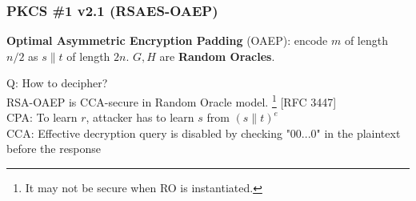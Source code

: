 \begin{comment}
\begin{frame}\frametitle{PKCS \#1 v1.5 (RSAES-PKCS1-v1\_5)}
\textbf{Public-Key Cryptography Standard (PKCS) \#1 version 1.5}:
\begin{itemize}
\item $N$ has $k$ bytes, $2^{8(k-1)} \le N < 2^{8k}$.
\item Message $m$ has $D (\le k-11)$ bytes.
\item Random pad $r$ has $(k-D-3)$ bytes without $\{0\}^8$.
\item The ciphertext:
\end{itemize}
\[[(\{0\}^8\|\{0\}^610\|r\|\{0\}^8\|m)^e \bmod N]\] 
\textbf{Security}: PKCS \#1 v1.5 is believed to be CPA-secure, although no proof based on the RSA assumption has ever been shown.
\end{frame}
\begin{frame}\frametitle{Attack on PKCS \#1 v1.5}
\textbf{PKCS \#1 v1.5 used in HTTPS}:\\
if the first 16 bits of message is not ``02'' which is standing for ``PKCK \#1'', then the web server returns error.\newline

\textbf{CCA to infer the message $m$ of ciphertext $c$}:
\begin{enumerate}
\item choose a string $r$, compute $c' \gets r^e\cdot c = (r\cdot \mathsf{PKCS1}(m))^e$.
\item send $c'$ to the web server. If the server does not return error, some bits of $m$ can be learned.
\item change $r$ and learn other bits of $m$.
\end{enumerate}

\textbf{HTTPS Defense} [RFC 5246]: if not ``02'', set the message as a random string.
\end{frame}
\end{comment}

\begin{frame}\frametitle{PKCS \#1 v2.1 (RSAES-OAEP)}
\textbf{Optimal Asymmetric Encryption Padding} (OAEP): encode $m$ of length $n/2$ as $s\| t$ of length $2n$. $G, H$ are \textbf{Random Oracles}.
\begin{figure}
\begin{center}

\end{center}
\end{figure}
\alert{Q: How to decipher?}\\
RSA-OAEP is CCA-secure in Random Oracle model. \footnote{It may not be secure when RO is instantiated.} [RFC 3447] \\
CPA: To learn $r$, attacker has to learn $s$ from $(s\| t)^e$\\
CCA: Effective decryption query is disabled by checking "00...0" in the plaintext before the response\\
\end{frame}

